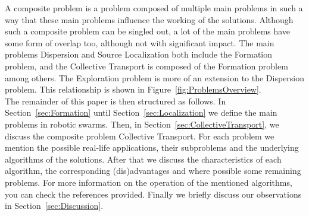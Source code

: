 A composite problem is a problem composed of multiple main problems in such a way that these main problems influence the working of the solutions. 
Although such a composite problem can be singled out, a lot of the main problems have some form of overlap too, although not with significant impact. 
The main problems Dispersion and Source Localization both include the Formation problem, and the Collective Transport is composed of the Formation problem among others.
The Exploration problem is more of an extension to the Dispersion problem.
This relationship is shown in Figure~\ref{fig:ProblemsOverview}.\\


The remainder of this paper is then structured as follows.
In Section~\ref{sec:Formation} until Section~\ref{sec:Localization} we define the main problems in robotic swarms. 
Then, in Section~\ref{sec:CollectiveTransport}, we discuss the composite problem Collective Transport. 
For each problem we mention the possible real-life applications, their subproblems and the underlying algorithms of the solutions.
After that we discuss the characteristics of each algorithm, the corresponding (dis)advantages and where possible some remaining problems.
For more information on the operation of the mentioned algorithms, you can check the references provided. 
Finally we briefly discuss our observations in Section~\ref{sec:Discussion}.




